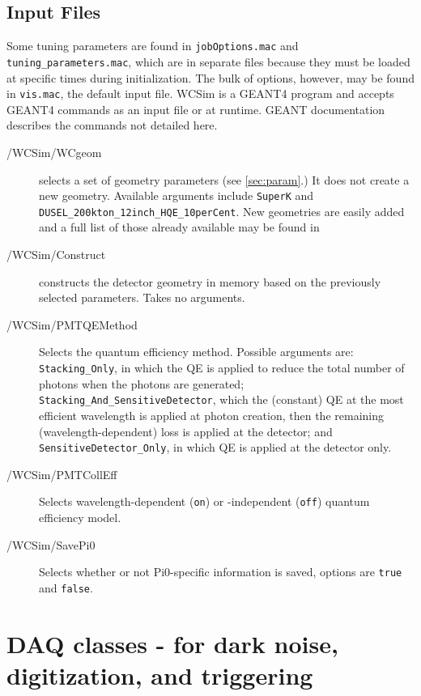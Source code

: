  

\subsection{Input Files}

Some tuning parameters are found in \texttt{jobOptions.mac} and \texttt{tuning\_parameters.mac}, which are in separate files because they must be loaded at specific times during initialization.  The bulk of options, however, may be found in \texttt{vis.mac}, the default input file.  WCSim is a GEANT4 program  and accepts GEANT4 commands as an input file or at runtime.  GEANT documentation describes the commands not detailed here.
\begin{description}
\item[/WCSim/WCgeom] selects a set of geometry parameters (see \ref{sec:param}.)  It does not create a new geometry.  Available arguments include \texttt{SuperK} and \texttt{DUSEL\_200kton\_12inch\_HQE\_10perCent}.  New geometries are easily added and a full list of those already available may be found in 
\item[/WCSim/Construct] constructs the detector geometry in memory based on the previously selected parameters.  Takes no arguments.
\item[/WCSim/PMTQEMethod] Selects the quantum efficiency method. Possible arguments are: \texttt{Stacking\_Only}, in which the QE is applied to reduce the total number of photons when the photons are generated; \texttt{Stacking\_And\_SensitiveDetector}, which the (constant) QE at the most efficient wavelength is applied at photon creation, then the remaining (wavelength-dependent) loss is applied at the detector; and \texttt{SensitiveDetector\_Only}, in which QE is applied at the detector only.
\item[/WCSim/PMTCollEff] Selects wavelength-dependent (\texttt{on}) or -independent (\texttt{off}) quantum efficiency model.
\item[/WCSim/SavePi0] Selects whether or not Pi0-specific information is saved, options are \texttt{true} and \texttt{false}.

\end{description}



\section{DAQ classes - for dark noise, digitization, and triggering}

